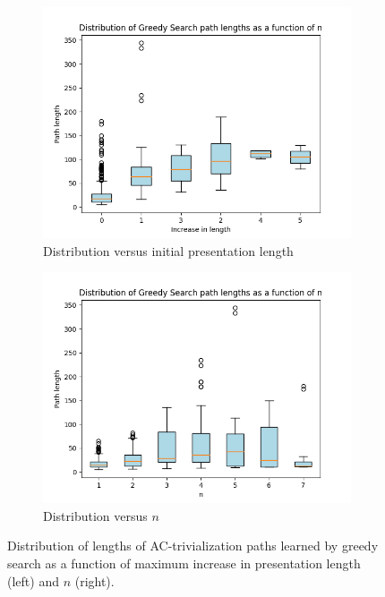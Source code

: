 \begin{figure}
	\centering
	\begin{subfigure}[b]{0.4\textwidth}
		\includegraphics[width=\textwidth]{fig/path_lengths_vs_length_increase.png}
		\caption{Distribution versus initial presentation length}
		\label{fig:path_lengths_vs_length_increase}
	\end{subfigure}
	\begin{subfigure}[b]{0.4\textwidth}
	\centering
		\includegraphics[width=1.1\textwidth]{fig/gs_path_lengths.png}
		\caption{Distribution versus $n$}
		\label{fig:gs_path_lengths}
	\end{subfigure}%
	\caption{Distribution of lengths of AC-trivialization paths learned by greedy search as a function of maximum increase in presentation length (left) and $n$ (right).} \label{fig:gs_path_length}
\end{figure}


